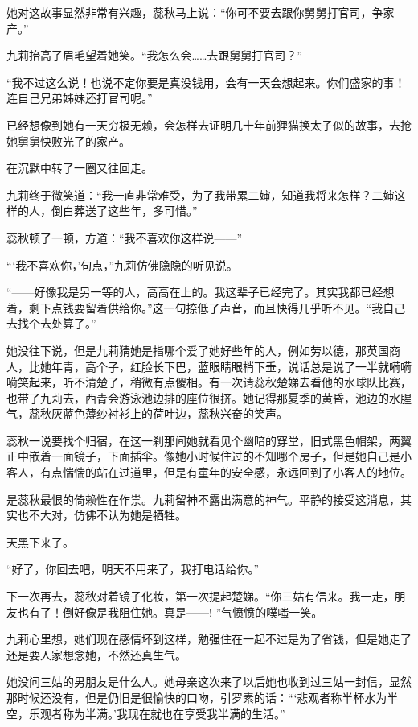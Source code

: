\par 她对这故事显然非常有兴趣，蕊秋马上说：“你可不要去跟你舅舅打官司，争家产。”
\par 九莉抬高了眉毛望着她笑。“我怎么会……去跟舅舅打官司？”
\par “我不过这么说！也说不定你要是真没钱用，会有一天会想起来。你们盛家的事！连自己兄弟姊妹还打官司呢。”
\par 已经想像到她有一天穷极无赖，会怎样去证明几十年前狸猫换太子似的故事，去抢她舅舅快败光了的家产。
\par 在沉默中转了一圈又往回走。
\par 九莉终于微笑道：“我一直非常难受，为了我带累二婶，知道我将来怎样？二婶这样的人，倒白葬送了这些年，多可惜。”
\par 蕊秋顿了一顿，方道：“我不喜欢你这样说——”
\par “‘我不喜欢你，’句点，”九莉仿佛隐隐的听见说。
\par “——好像我是另一等的人，高高在上的。我这辈子已经完了。其实我都已经想着，剩下点钱要留着供给你。”这一句捺低了声音，而且快得几乎听不见。“我自己去找个去处算了。”
\par 她没往下说，但是九莉猜她是指哪个爱了她好些年的人，例如劳以德，那英国商人，比她年青，高个子，红脸长下巴，蓝眼睛眼梢下垂，说话总是说了一半就嗬嗬嗬笑起来，听不清楚了，稍微有点傻相。有一次请蕊秋楚娣去看他的水球队比赛，也带了九莉去，西青会游泳池边排的座位很挤。她记得那夏季的黄昏，池边的水腥气，蕊秋灰蓝色薄纱衬衫上的荷叶边，蕊秋兴奋的笑声。
\par 蕊秋一说要找个归宿，在这一刹那间她就看见个幽暗的穿堂，旧式黑色帽架，两翼正中嵌着一面镜子，下面插伞。像她小时候住过的不知哪个房子，但是她自己是小客人，有点惴惴的站在过道里，但是有童年的安全感，永远回到了小客人的地位。
\par 是蕊秋最恨的倚赖性在作祟。九莉留神不露出满意的神气。平静的接受这消息，其实也不大对，仿佛不认为她是牺牲。
\par 天黑下来了。
\par “好了，你回去吧，明天不用来了，我打电话给你。”
\par 下一次再去，蕊秋对着镜子化妆，第一次提起楚娣。“你三姑有信来。我一走，朋友也有了！倒好像是我阻住她。真是——! ”气愤愤的噗嗤一笑。
\par 九莉心里想，她们现在感情坏到这样，勉强住在一起不过是为了省钱，但是她走了还是要人家想念她，不然还真生气。
\par 她没问三姑的男朋友是什么人。她母亲这次来了以后她也收到过三姑一封信，显然那时候还没有，但是仍旧是很愉快的口吻，引罗素的话：“‘悲观者称半杯水为半空，乐观者称为半满。’我现在就也在享受我半满的生活。”
